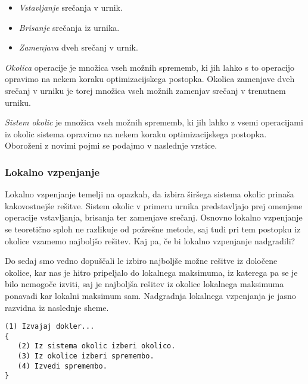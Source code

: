 \documentclass[a4paper,10pt]{article}
\begin{document}
\begin {itemize}
  \item \emph{Vstavljanje} srečanja v urnik.
  \item \emph{Brisanje} srečanja iz urnika.
  \item \emph{Zamenjava} dveh srečanj v urnik.
\end{itemize}

\emph{Okolica} operacije je množica vseh možnih sprememb, ki jih lahko s to operacijo
opravimo na nekem koraku optimizacijskega postopka. Okolica zamenjave dveh srečanj v urniku
je torej množica vseh možnih zamenjav srečanj v trenutnem urniku.

\emph{Sistem okolic} je množica vseh možnih sprememb, ki jih lahko z vsemi operacijami iz
okolic sistema opravimo na nekem koraku optimizacijskega postopka. Oboroženi z novimi pojmi
se podajmo v naslednje vrstice.

\subsubsection{Lokalno vzpenjanje} %

Lokalno vzpenjanje temelji na opazkah, da izbira širšega sistema okolic prinaša kakovostnejše
rešitve. Sistem okolic v primeru urnika predstavljajo prej omenjene operacije vstavljanja,
brisanja ter zamenjave srečanj. Osnovno lokalno vzpenjanje se teoretično sploh ne razlikuje
od požrešne metode, saj tudi pri tem postopku iz okolice vzamemo najboljšo rešitev. Kaj pa,
če bi lokalno vzpenjanje nadgradili?

Do sedaj smo vedno dopuščali le izbiro najboljše možne rešitve iz določene okolice, kar nas
je hitro pripeljalo do lokalnega maksimuma, iz katerega pa se je bilo nemogoče izviti, saj
je najboljša rešitev iz okolice lokalnega maksimuma ponavadi kar lokalni maksimum sam.
Nadgradnja lokalnega vzpenjanja je jasno razvidna iz naslednje sheme.

\begin{verbatim}
(1) Izvajaj dokler...
{
   (2) Iz sistema okolic izberi okolico.
   (3) Iz okolice izberi spremembo.
   (4) Izvedi spremembo.
}
\end{verbatim}
\end{document}
